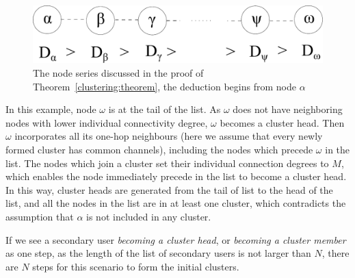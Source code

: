 \documentclass[10pt,journal,compsoc]{IEEEtran}
\makeatletter
\theoremstyle{mytheoremstyle}
\theoremstyle{mytheoremstyle}
\theoremstyle{mytheoremstyle}
\renewenvironment{proof}[1][\proofname]{%
      \par\pushQED{\qed}\fontfamily{ptm}\selectfont%
      \topsep6\p@\@plus6\p@\relax
      \trivlist\item[\hskip\labelsep\bfseries#1\@addpunct{.}]%
      \ignorespaces
    }{%
      \popQED\endtrivlist\@endpefalse
    }
\makeatother
\begin{document}
\begin{proof}
\begin{figure}[ht!]
  \centering
\includegraphics[width=0.6\linewidth]{lemma1.pdf}
	\caption{The node series discussed in the proof of Theorem~\ref{clustering:theorem}, the deduction begins from node $\alpha$}
	\label{lemma1}
\end{figure}


In this example, node $\omega$ is at the tail of the list.
As $\omega$ does not have neighboring nodes with lower individual connectivity degree, $\omega$ becomes a cluster head.
Then $\omega$ incorporates all its one-hop neighbours (here we assume that every newly formed cluster has common channels), including the nodes which precede $\omega$ in the list.
The nodes which join a cluster set their individual connection degrees to $M$, which enables the node immediately precede in the list to become a cluster head.
In this way, cluster heads are generated from the tail of list to the head of the list, and all the nodes in the list are in at least one cluster, which contradicts the assumption that $\alpha$ is not included in any cluster.

If we see a secondary user \textit{becoming a cluster head}, or \textit{becoming a cluster member} as one step, as the length of the list of secondary users is not larger than $N$, there are $N$ steps for this scenario to form the initial clusters.

\end{proof}


%
\end{document}
